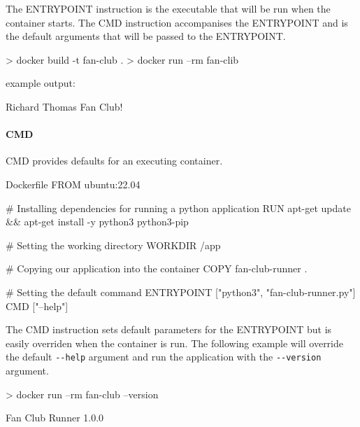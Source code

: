 \documentclass{csse4400}
\begin{document}
The ENTRYPOINT instruction is the executable that will be run when the container starts.
The CMD instruction accompanises the ENTRYPOINT and is the default arguments that will be passed to the ENTRYPOINT.

\begin{code}[language=shell,numbers=none]{}
> docker build -t fan-club .
> docker run --rm fan-clib
\end{code}

example output:

\begin{code}[language=shell,numbers=none]{}
Richard Thomas Fan Club!
\end{code}

\paragraph{CMD}
CMD provides defaults for an executing container.

\begin{code}[language=docker,numbers=none]{Dockerfile}
FROM ubuntu:22.04

# Installing dependencies for running a python application
RUN apt-get update && apt-get install -y python3 python3-pip

# Setting the working directory
WORKDIR /app

# Copying our application into the container
COPY fan-club-runner .

# Setting the default command
ENTRYPOINT ["python3", "fan-club-runner.py"]
CMD ["--help"]
\end{code}

The CMD instruction sets default parameters for the ENTRYPOINT but is easily overriden when the container is run.
The following example will override the default \texttt{-{}-help} argument and run the application with the \texttt{-{}-version} argument.

\begin{code}[language=shell,numbers=none]{}
> docker run --rm fan-club --version
\end{code}

\begin{code}[language=shell,numbers=none]{}
  Fan Club Runner 1.0.0
\end{code}

\end{document}
